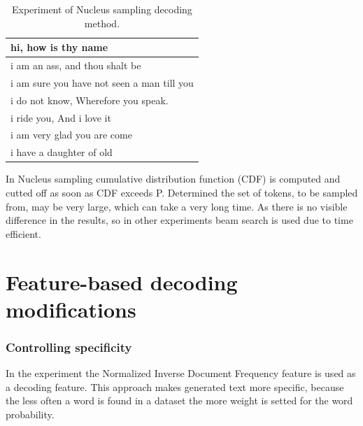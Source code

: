 \begin{table}
\centering
 \begin{tabular}{|p{14cm}|} 
 \hline
  hi, how is thy name \\
 \hline
  i am an ass, and thou shalt be \\
 \hline
  i am sure you have not seen a man till you \\
 \hline 
  i do not know, Wherefore you speak. \\
 \hline 
 i ride you, And i love it \\
 \hline 
 i am very glad you are come \\
 \hline 
 i have a daughter of old \\
 \hline
 \end{tabular}
 \caption{Experiment of Nucleus sampling decoding method.}
\label{tab:nucleus_sampling}
\end{table}

In Nucleus sampling cumulative distribution function (CDF) is computed and cutted off as soon as CDF exceeds P. Determined the set of tokens, to be sampled from, may be very large, which can take a very long time. As there is no visible difference in the results, so in other experiments beam search is used due to time efficient.

\section{Feature-based decoding modifications}
\subsubsection{Controlling specificity}
In the experiment the Normalized Inverse Document Frequency feature is used as a decoding feature. This approach makes generated text more specific, because the less often a word is found in a dataset the more weight is setted for the word probability. 

